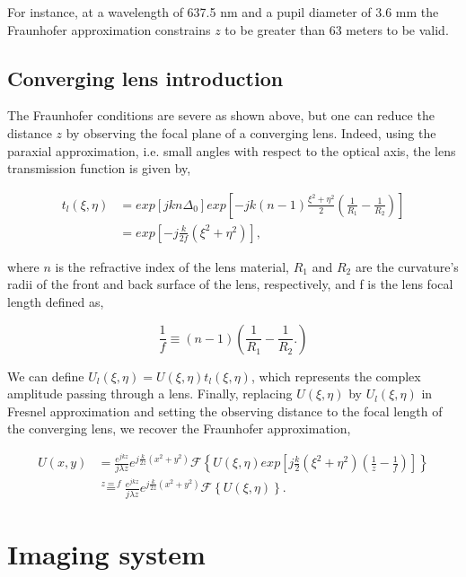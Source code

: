 For instance, at a wavelength of 637.5 nm and a pupil diameter of 3.6 mm the Fraunhofer approximation constrains $z$ to be greater than 63 meters to be valid.

\subsection{Converging lens introduction}
\label{subsec:ConvLensIntro}

The Fraunhofer conditions are severe as shown above, but one can reduce the distance $z$ by observing the focal plane of a converging lens. Indeed, using the paraxial approximation, i.e. small angles with respect to the optical axis, the lens transmission function is given by,

\begin{align}
t_l(\xi , \eta) &= exp \left[ j k n \Delta_0 \right] exp \left[ -jk \left( n-1 \right)\frac{ \xi^2 + \eta^2 }{2}\left( \frac{1}{R_1} - \frac{1}{R_2}\right) \right] \nonumber \\ 
&= exp \left[ -j \frac{k}{2f} (\xi^2+\eta^2) \right] ,
\label{eqt:lensTl}
\end{align}

where $n$ is the refractive index of the lens material, $R_1$ and $R_2$ are the curvature's radii of the front and back surface of the lens, respectively, and f is the lens focal length defined as,

\begin{equation}
\frac{1}{f} \equiv (n-1)\left(\frac{1}{R_1}-\frac{1}{R_2}. \right)
\label{eqt:focal_length}
\end{equation}

We can define $U_l(\xi,\eta) = U(\xi,\eta)t_l(\xi,\eta)$, which represents the complex amplitude passing through a lens. Finally, replacing $U(\xi,\eta)$ by $U_l(\xi,\eta)$ in Fresnel approximation and setting the observing distance to the focal length of the converging lens, we recover the Fraunhofer approximation,

\begin{align}
U(x,y) &= \frac{e^{jkz}}{j\lambda z} e^{j\frac{k}{2z}(x^2+y^2)}  \mathcal{F}\left\lbrace U(\xi,\eta) exp\left[j\frac{k}{2}(\xi^2+\eta^2)(\frac{1}{z}-\frac{1}{f})\right]\right\rbrace \nonumber \\
&\overset{z=f}{=} \frac{e^{jkz}}{j\lambda z} e^{j\frac{k}{2z}(x^2+y^2)}  \mathcal{F}\left\lbrace U(\xi,\eta)\right\rbrace.
\end{align}

\section{Imaging system}
\label{sec:ImSystem}

